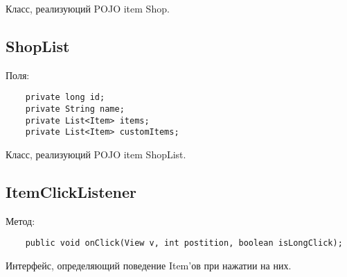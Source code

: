 Класс, реализуюций POJO item Shop.


\subsection{ShopList}
Поля:\\
\begin{small}
    \begin{verbatim}
    private long id;
    private String name;
    private List<Item> items;
    private List<Item> customItems;
\end{verbatim}
\end{small}

Класс, реализуюций POJO item ShopList.


\subsection{ItemClickListener}
Метод:\\
\begin{small}
    \begin{verbatim}
    public void onClick(View v, int postition, boolean isLongClick);
\end{verbatim}
\end{small}
Интерфейс, определяющий поведение Item'ов при нажатии на них.


